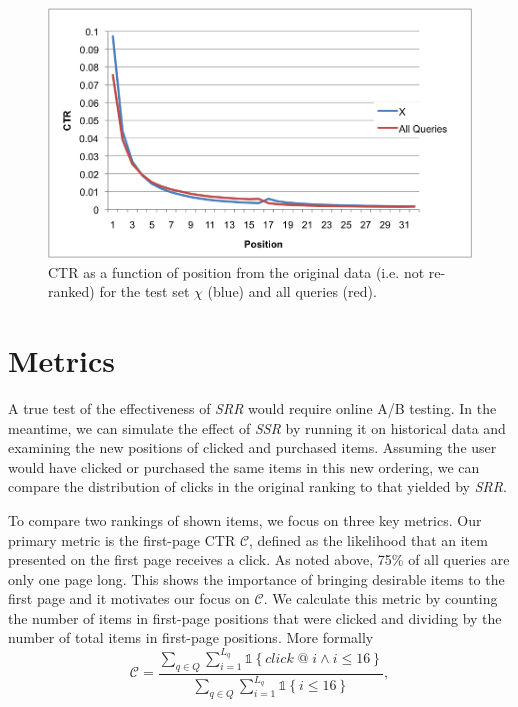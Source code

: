 \documentclass{article}
\begin{document}
\begin{figure}[htbp!]
    \centering
    \includegraphics[width=\textwidth]{CTRcompare.png}
    \caption{CTR as a function of position from the original data (i.e. not re-ranked) for the test set $\chi$ (blue) and all queries (red).}
    \label{fig:ctr_vs_position}
\end{figure}

\section{Metrics}

A true test of the effectiveness of {\em SRR} would require online A/B
testing. In the meantime, we can simulate the effect of {\em SSR} by running it
on historical data and examining the new positions of clicked and purchased items.
Assuming the user would have clicked or purchased the same items in this new ordering, 
we can compare the distribution of clicks in the original ranking to that yielded 
by {\em SRR}.

To compare two rankings of shown items, we focus on three key metrics. Our primary 
metric is the first-page CTR $\mathscr{C}$, defined as the likelihood that an item 
presented on the first page receives a click. As noted above, 75\% of all queries 
are only one page long. This shows the importance of bringing desirable items to the 
first page and it motivates our focus on $\mathscr{C}$. We calculate this metric by 
counting the number of items in first-page positions that were clicked and dividing 
by the number of total items in first-page positions. More formally
\begin{equation*}
    \mathscr{C} = \frac{\sum_{q \in Q}\sum_{i=1}^{L_q}\mathds{1}\left\{click\; @\; i \wedge i \leq 16\right\}}{\sum_{q \in Q}\sum_{i=1}^{L_q}\mathds{1}\left\{i \leq 16\right\}},
\end{equation*}
\end{document}

